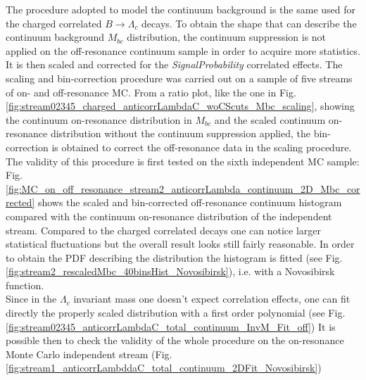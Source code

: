 \noindent  The procedure adopted to model the continuum background is the same used for the charged correlated $B \rightarrow \Lambda_c$ decays. To obtain the shape that can describe the continuum background  $M_{bc}$ distribution, the continuum suppression is not applied on the off-resonance continuum sample in order to acquire more statistics. It is then scaled and corrected for the \textit{SignalProbability} correlated effects. The scaling and bin-correction procedure was carried out on a sample of five streams of on- and off-resonance MC. From a ratio plot, like the one in Fig. \ref{fig:stream02345_charged_anticorrLambdaC_woCScuts_Mbc_scaling}, showing the continuum on-resonance distribution in $M_{bc}$ and the scaled continuum on-resonance distribution without the continuum suppression applied, the bin-correction is obtained to correct the off-resonance data in the scaling procedure. The validity of this procedure is first tested on the sixth independent MC sample:      
Fig. \ref{fig:MC_on_off_resonance_stream2_anticorrLambda_continuum_2D_Mbc_corrected} shows the scaled and bin-corrected off-resonance continuum histogram compared with the continuum on-resonance distribution of the independent stream. 
Compared to the charged correlated decays one can notice larger statistical fluctuations but the overall result looks still fairly reasonable. In order to obtain the PDF describing the distribution the histogram is fitted (see Fig. \ref{fig:stream2_rescaledMbc_40binsHist_Novosibirsk}), i.e. with a Novosibirsk function. \\
Since in the $\Lambda_c$ invariant mass one doesn't expect correlation effects, one can fit directly the properly scaled distribution with a first order polynomial (see Fig.\ref{fig:stream02345_anticorrLambdaC_total_continuum_InvM_Fit_off})
\noindent It is possible then to check the validity of the whole procedure on the on-resonance Monte Carlo independent stream (Fig. \ref{fig:stream1_anticorrLambddaC_total_continuum_2DFit_Novosibirsk})  



